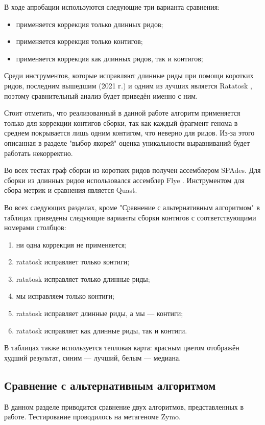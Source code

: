 \documentclass[14pt]{matmex-diploma-custom}
\begin{document}
В ходе апробации используются следующие три варианта сравнения:
\begin{itemize}
    \item применяется коррекция только длинных ридов;
    \item применяется коррекция только контигов;
    \item применяется коррекция как длинных ридов, так и контигов;
\end{itemize}

Среди инструментов, которые исправляют длинные риды при помощи коротких ридов, последним вышедшим (2021 г.) и одним из лучших является Ratatosk \cite{art:holley2021ratatosk, art:zhang2020comprehensive, art:fu2019comparative}, поэтому сравнительный анализ будет приведён именно с ним.

Стоит отметить, что реализованный в данной работе алгоритм применяется только для коррекции контигов сборки, так как каждый фрагмент генома в среднем покрывается лишь одним контигом, что неверно для ридов. Из-за этого описанная в разделе "выбор якорей" оценка уникальности выравниваний будет работать некорректно.

Во всех тестах граф сборки из коротких ридов получен ассемблером SPAdes. Для сборки из длинных ридов использовался ассемблер Flye \cite{art:flye}. Инструментом для сбора метрик и сравнения является Quast.

Во всех следующих разделах, кроме "Сравнение с альтернативным алгоритмом" в таблицах приведены следующие варианты сборки контигов с соответствующими номерами столбцов:
\begin{enumerate}
    \item ни одна коррекция не применяется;
    \item ratatosk исправляет только контиги;
    \item ratatosk исправляет только длинные риды;
    \item мы исправляем только контиги;
    \item ratatosk исправляет длинные риды, а мы --- контиги;
    \item ratatosk исправляет как длинные риды, так и контиги.
\end{enumerate}

В таблицах также используется тепловая карта: красным цветом отображён худший результат, синим --- лучший, белым --- медиана. 

\subsection{Сравнение с альтернативным алгоритмом }
В данном разделе приводится сравнение двух алгоритмов, представленных в работе. Тестирование проводилось на метагеноме Zymo.
\end{document}

